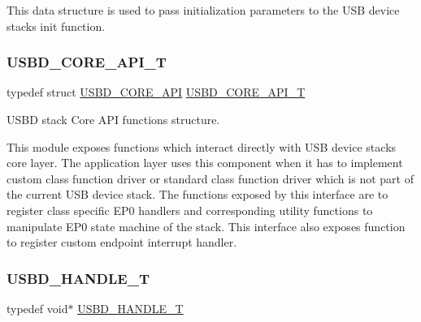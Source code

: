 This data structure is used to pass initialization parameters to the U\+SB device stack\textquotesingle{}s init function. \mbox{\label{group___u_s_b_d___core_ga6a53e8395d1c68f98d18ca4a49b75baa}} 
\subsubsection{\texorpdfstring{U\+S\+B\+D\+\_\+\+C\+O\+R\+E\+\_\+\+A\+P\+I\+\_\+T}{USBD\_CORE\_API\_T}}
{\footnotesize\ttfamily typedef struct \hyperlink{struct_u_s_b_d___c_o_r_e___a_p_i}{U\+S\+B\+D\+\_\+\+C\+O\+R\+E\+\_\+\+A\+PI}  \hyperlink{group___u_s_b_d___core_ga6a53e8395d1c68f98d18ca4a49b75baa}{U\+S\+B\+D\+\_\+\+C\+O\+R\+E\+\_\+\+A\+P\+I\+\_\+T}}



U\+S\+BD stack Core A\+PI functions structure. 

This module exposes functions which interact directly with U\+SB device stack\textquotesingle{}s core layer. The application layer uses this component when it has to implement custom class function driver or standard class function driver which is not part of the current U\+SB device stack. The functions exposed by this interface are to register class specific E\+P0 handlers and corresponding utility functions to manipulate E\+P0 state machine of the stack. This interface also exposes function to register custom endpoint interrupt handler. \mbox{\label{group___u_s_b_d___core_gafdbb2204d929cb9d75736bd2b42342ac}} 
\subsubsection{\texorpdfstring{U\+S\+B\+D\+\_\+\+H\+A\+N\+D\+L\+E\+\_\+T}{USBD\_HANDLE\_T}}
{\footnotesize\ttfamily typedef void$\ast$ \hyperlink{group___u_s_b_d___core_gafdbb2204d929cb9d75736bd2b42342ac}{U\+S\+B\+D\+\_\+\+H\+A\+N\+D\+L\+E\+\_\+T}}

